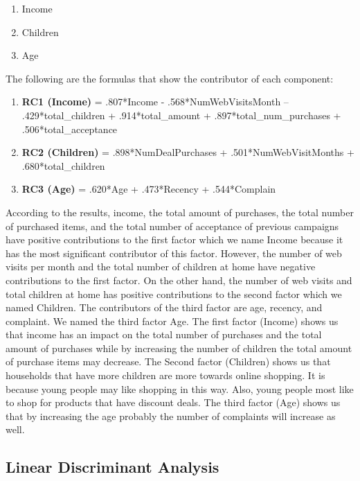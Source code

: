 \documentclass[11pt]{article} %
\begin{document}
\begin{enumerate}
    \item Income
    \item Children
    \item Age
\end{enumerate}
The following are the formulas that show the contributor of each component: 
\begin{enumerate}
    \item \textbf{RC1 (Income)} = .807*Income - .568*NumWebVisitsMonth – .429*total\_children + .914*total\_amount + .897*total\_num\_purchases + .506*total\_acceptance
    \item \textbf{RC2 (Children)} = .898*NumDealPurchases + .501*NumWebVisitMonths + \\ .680*total\_children
    \item \textbf{RC3 (Age)} = .620*Age + .473*Recency + .544*Complain
\end{enumerate}

\quad According to the results, income, the total amount of purchases, the total number of purchased items, and the total number of acceptance of previous campaigns have positive contributions to the first factor which we name Income because it has the most significant contributor of this factor. However, the number of web visits per month and the total number of children at home have negative contributions to the first factor. On the other hand, the number of web visits and total children at home has positive contributions to the second factor which we named Children. The contributors of the third factor are age, recency, and complaint. We named the third factor Age. The first factor (Income) shows us that income has an impact on the total number of purchases and the total amount of purchases while by increasing the number of children the total amount of purchase items may decrease. The Second factor (Children) shows us that households that have more children are more towards online shopping. It is because young people may like shopping in this way. Also, young people most like to shop for products that have discount deals. The third factor (Age) shows us that by increasing the age probably the number of complaints will increase as well.
\subsection{Linear Discriminant Analysis}
\end{document}
